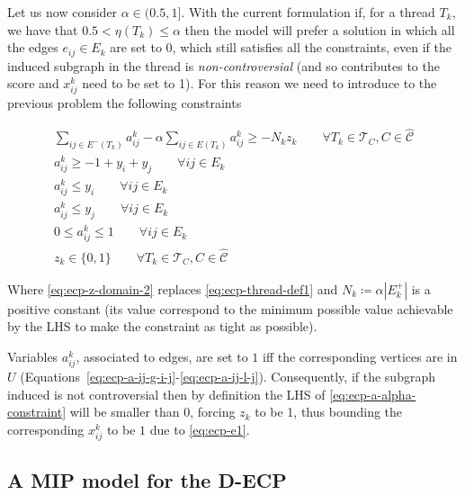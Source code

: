 \clearpage

Let us now consider $\alpha \in (0.5, 1]$. With the current formulation if, for
a thread $T_k$, we have that $0.5 < \eta(T_k) \leq \alpha $ then the model will
prefer a solution in which all the edges $e_{ij} \in E_k$ are set to $0$, which
still satisfies all the constraints, even if the induced subgraph in the thread
is \emph{non-controversial} (and so contributes to the score and $x_{ij}^{k}  $
need to be set to 1). For this reason we need to introduce to the previous
problem the following constraints

\begin{gather}
	\label{eq:ecp-a-alpha-constraint}
	\sum^{}_{ij \in E^{-} (T_k)} a_{ij}^{k}  - \alpha \sum^{}_{ij \in E(T_k)}
	a_{ij} ^{k} \geq - N_{k} z_{k}  \quad\quad \forall T_{k} \in \mathcal{T} _{C}, C \in
	\hat{\mathcal{C}} \\
	\label{eq:ecp-a-ij-g-i-j}
	a_{ij}^{k} \geq -1 + y_i + y_j \quad\quad \forall ij \in E_k \\
	\label{eq:ecp-a-ij-l-i}
	a_{ij}^{k} \leq y_i\quad\quad \forall ij \in E_k \\
	\label{eq:ecp-a-ij-l-j}
	a_{ij}^{k} \leq y_j \quad\quad \forall ij \in E_k \\
	\label{eq:ecp-a-domain-2}
	0 \leq a_{ij}^{k} \leq 1 \quad\quad \forall ij \in E_k \\
	\label{eq:ecp-z-domain-2}
	z _{k} \in  \{0, 1\} \quad\quad \forall T_{k} \in \mathcal{T} _{C}, C \in
	\hat{\mathcal{C}}
\end{gather}

Where \autoref{eq:ecp-z-domain-2} replaces \autoref{eq:ecp-thread-def1} and
$N_k \coloneqq \alpha |E^{+}_k| $ is a positive constant (its value correspond
to the minimum possible value achievable by the LHS to make the constraint as
tight as possible).

Variables $a_{ij}^{k}  $, associated to edges, are set to $1$ iff the
corresponding vertices are in $U$
(Equations~\ref{eq:ecp-a-ij-g-i-j}-\ref{eq:ecp-a-ij-l-j}). Consequently, if the
subgraph induced is not controversial then by definition the LHS of
\autoref{eq:ecp-a-alpha-constraint} will be smaller than $0$, forcing $z_k$ to
be 1, thus bounding the corresponding $x_{ij} ^{k} $ to be $1$ due to
\autoref{eq:ecp-e1}.


\subsection{A MIP model for the \acrshort{D-ECP}}%
\label{sub:a_mip_model_for_the_d_ecp}

